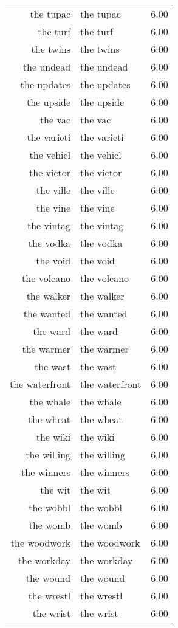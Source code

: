 \begin{table}[ht]
\begin{tabular}{rlr}
  the tupac & the tupac & 6.00 \\ 
  the turf & the turf & 6.00 \\ 
  the twins & the twins & 6.00 \\ 
  the undead & the undead & 6.00 \\ 
  the updates & the updates & 6.00 \\ 
  the upside & the upside & 6.00 \\ 
  the vac & the vac & 6.00 \\ 
  the varieti & the varieti & 6.00 \\ 
  the vehicl & the vehicl & 6.00 \\ 
  the victor & the victor & 6.00 \\ 
  the ville & the ville & 6.00 \\ 
  the vine & the vine & 6.00 \\ 
  the vintag & the vintag & 6.00 \\ 
  the vodka & the vodka & 6.00 \\ 
  the void & the void & 6.00 \\ 
  the volcano & the volcano & 6.00 \\ 
  the walker & the walker & 6.00 \\ 
  the wanted & the wanted & 6.00 \\ 
  the ward & the ward & 6.00 \\ 
  the warmer & the warmer & 6.00 \\ 
  the wast & the wast & 6.00 \\ 
  the waterfront & the waterfront & 6.00 \\ 
  the whale & the whale & 6.00 \\ 
  the wheat & the wheat & 6.00 \\ 
  the wiki & the wiki & 6.00 \\ 
  the willing & the willing & 6.00 \\ 
  the winners & the winners & 6.00 \\ 
  the wit & the wit & 6.00 \\ 
  the wobbl & the wobbl & 6.00 \\ 
  the womb & the womb & 6.00 \\ 
  the woodwork & the woodwork & 6.00 \\ 
  the workday & the workday & 6.00 \\ 
  the wound & the wound & 6.00 \\ 
  the wrestl & the wrestl & 6.00 \\ 
  the wrist & the wrist & 6.00 \\ 

\end{tabular}
\end{table}

